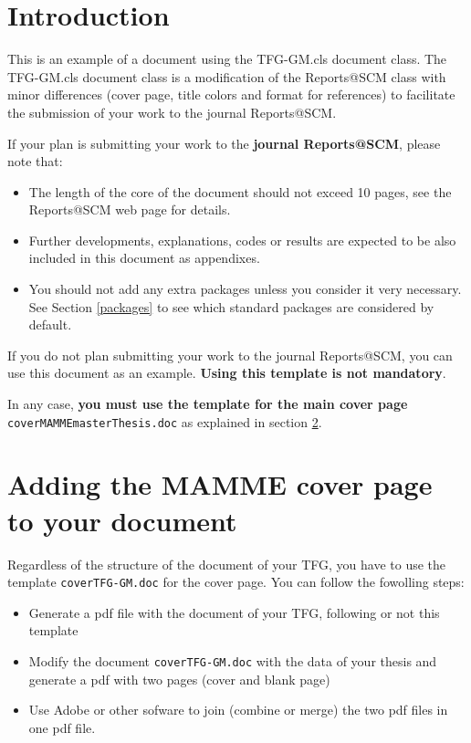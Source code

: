 \documentclass[12,twoside]{TFG-GM}
\theoremstyle{definition}
\theoremstyle{remark}
\begin{document}
\maketitle

\section{Introduction}

This is an example of a document using the TFG-GM.cls document class. The TFG-GM.cls document class is a modification of the Reports@SCM class with minor differences (cover page, title colors and format for references) to facilitate the submission of your work to the journal Reports@SCM.

If your plan is submitting your work to the \textbf{journal Reports@SCM}, please note that:
\begin{itemize}
	\item The length of the core of the document should not exceed 10 pages, see the Reports@SCM web page for details.
	\item Further developments, explanations, codes or results are expected to be also included in this document as appendixes.
	\item You should not add any extra packages unless you consider it very necessary. See Section \ref{packages} to see which standard packages  are considered by default. 
\end{itemize} 

If you do not plan submitting your work to the journal  Reports@SCM, you can use this document as an example. \textbf{Using this template is not mandatory}.
 
In any case, \textbf{you must use the template for the main cover page} \texttt{coverMAMMEmasterThesis.doc} as explained in section \ref{sec:coverPage}.

\section{Adding the MAMME cover page to your document}
\label{sec:coverPage}
  
Regardless of the structure of the document of your TFG, you have to use the template \texttt{coverTFG-GM.doc} for the cover page. You can follow the fowolling steps:
\begin{itemize}
	\item Generate a pdf file with the document of your TFG, following or not this template
	\item Modify the document \texttt{coverTFG-GM.doc} with the data of your thesis and generate a pdf with two pages (cover and blank page)
	\item Use Adobe or other sofware to join (combine or merge) the two pdf files in one pdf file. 
\end{itemize}
 
\end{document}

